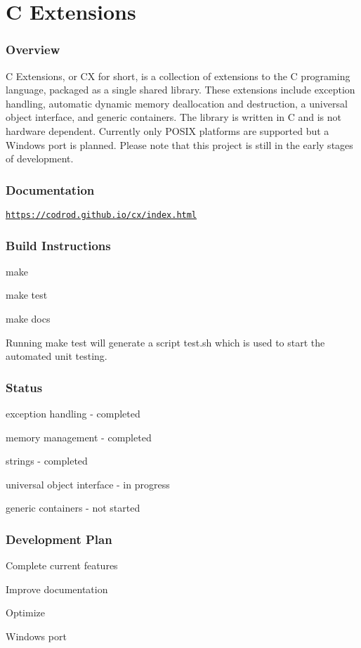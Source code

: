 \section*{C Extensions}

\subsubsection*{Overview}

C Extensions, or CX for short, is a collection of extensions to the C programing language, packaged as a single shared library. These extensions include exception handling, automatic dynamic memory deallocation and destruction, a universal object interface, and generic containers. The library is written in C and is not hardware dependent. Currently only P\+O\+S\+IX platforms are supported but a Windows port is planned. Please note that this project is still in the early stages of development. \subsubsection*{Documentation}

\href{https://codrod.github.io/cx/index.html}{\tt https\+://codrod.\+github.\+io/cx/index.\+html} \subsubsection*{Build Instructions}


\begin{DoxyItemize}
\item make 
\item make test 
\item make docs 
\end{DoxyItemize}

Running \textquotesingle{}make test\textquotesingle{} will generate a script \textquotesingle{}test.\+sh\textquotesingle{} which is used to start the automated unit testing. 

\subsubsection*{Status}


\begin{DoxyItemize}
\item exception handling -\/ completed 
\item memory management -\/ completed 
\item strings -\/ completed 
\item universal object interface -\/ in progress 
\item generic containers -\/ not started 
\end{DoxyItemize}\subsubsection*{Development Plan}


\begin{DoxyEnumerate}
\item Complete current features 
\item Improve documentation 
\item Optimize 
\item Windows port 
\end{DoxyEnumerate}